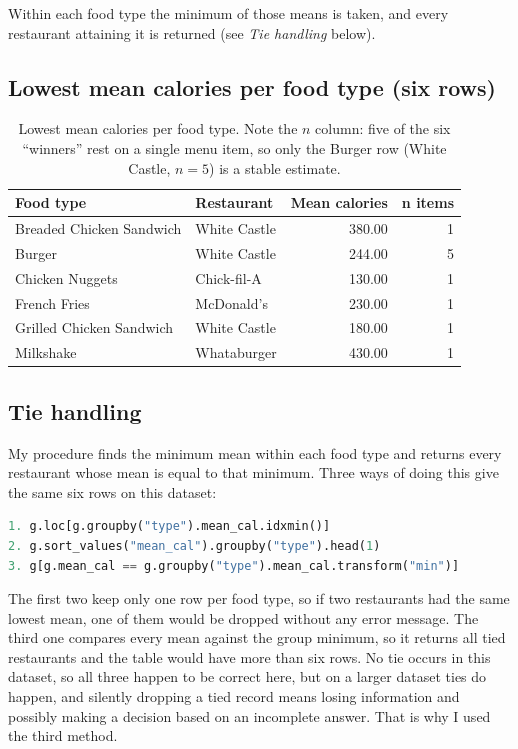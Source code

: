 \documentclass[11pt]{article}
\begin{document}
Within each food type the minimum of those means is taken, and every restaurant attaining it
is returned (see \emph{Tie handling} below).

\subsection*{Lowest mean calories per food type (six rows)}
\begin{table}[H]\centering\small
\begin{tabular}{llrr}
\toprule
Food type & Restaurant & Mean calories & n items \\
\midrule
Breaded Chicken Sandwich & White Castle & 380.00 & 1 \\
Burger                   & White Castle & 244.00 & 5 \\
Chicken Nuggets          & Chick-fil-A  & 130.00 & 1 \\
French Fries             & McDonald's   & 230.00 & 1 \\
Grilled Chicken Sandwich & White Castle & 180.00 & 1 \\
Milkshake                & Whataburger  & 430.00 & 1 \\
\bottomrule
\end{tabular}
\caption{Lowest mean calories per food type. Note the $n$ column: five of the six
``winners'' rest on a single menu item, so only the Burger row (White Castle, $n=5$)
is a stable estimate.}
\end{table}

\subsection*{Tie handling}
My procedure finds the minimum mean within each food type and returns every restaurant whose
mean is equal to that minimum. Three ways of doing this give the same six rows on this
dataset:
\begin{lstlisting}[language=Python]
1. g.loc[g.groupby("type").mean_cal.idxmin()]
2. g.sort_values("mean_cal").groupby("type").head(1)
3. g[g.mean_cal == g.groupby("type").mean_cal.transform("min")]
\end{lstlisting}

\noindent The first two keep only one row per food type, so if two restaurants had the same
lowest mean, one of them would be dropped without any error message. The third one compares
every mean against the group minimum, so it returns all tied restaurants and the table would
have more than six rows. No tie occurs in this dataset, so all three happen to be correct
here, but on a larger dataset ties do happen, and silently dropping a tied record means
losing information and possibly making a decision based on an incomplete answer. That is why
I used the third method.
\end{document}
